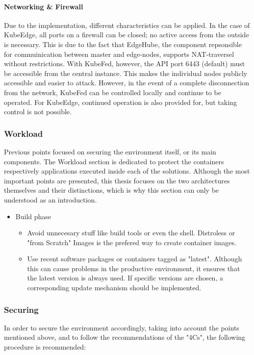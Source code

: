 \documentclass[MSC,Master,english]{twbook}%
\begin{document}
\paragraph{Networking \& Firewall} Due to the implementation, different characteristics can be applied. In the case of KubeEdge, all ports on a firewall can be closed; no active access from the outside is necessary. This is due to the fact that EdgeHube, the component repsonsible for commuinication between master and edge-nodes,  supports \ac{NAT}-traversel without restrictions.
With KubeFed, however, the API port 6443 (default) must be accessible from the central instance. This makes the individual nodes publicly accessible and easier to attack. However, in the event of a complete disconnection from the network, KubeFed can be controlled locally and continue to be operated. For KubeEdge, continued operation is also provided for, but taking control is not possible. 

\subsubsection{Workload} Previous points focused on securing the environment itself, or its main components. The Workload section is dedicated to protect the containers respectively applications executed inside each of the solutions. Although the most important points are presented, this thesis focuses on the two architectures themselves and their distinctions, which is why this section can only be understood as an introduction.

\begin{itemize}
    \item Build phase
    \begin{itemize}
        \item Avoid unnecesary stuff like build tools or even the shell. Distroless or "from Scratch" Images is the prefered way to create container images.
        \item Use recent software packages or containers tagged as "latest". Although this can cause problems in the productive environment, it ensures that the latest version is always used. If specific versions are chosen, a corresponding update mechanism should be implemented.
    \end{itemize}
\end{itemize}

\subsubsection{Securing}
In order to secure the environment accordingly, taking into account the points mentioned above, and to follow the recommendations of the "4Cs", the following procedure is recommended:
\end{document}
